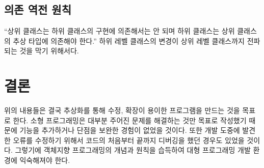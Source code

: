 \documentclass{article}
\begin{document}
\subsection{의존 역전 원칙}
“상위 클래스는 하위 클래스의 구현에 의존해서는 안 되며 하위 클래스는 상위 클래스의 추상 타입에 의존해야 한다.” 하위 레벨 클래스의 변경이 상위 레벨 클래스까지 전파되는 것을 막기 위해서다.
\section{결론}
위의 내용들은 결국 추상화를 통해 수정, 확장이 용이한 프로그램을 만드는 것을 목표로 한다. 소형 프로그래밍은 대부분 주어진 문제를 해결하는 것만 목표로 작성했기 때문에 기능을 추가하거나 단점을 보완한 경험이 없었을 것이다. 또한 개발 도중에 발견한 오류를 수정하기 위해서 코드의 처음부터 끝까지 디버깅을 했던 경우도 있었을 것이다. 그렇기에 객체지향 프로그래밍의 개념과 원칙을 습득하여 대형 프로그래밍 개발 환경에 익숙해져야 한다.
    
\end{document}
